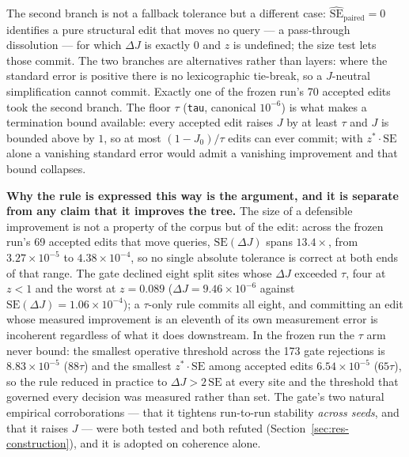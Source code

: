 The second branch is not a fallback tolerance but a different case:
$\widehat{\mathrm{SE}}_{\text{paired}} = 0$ identifies a pure structural edit that moves
no query --- a pass-through dissolution --- for which $\Delta J$ is exactly $0$ and $z$
is undefined; the size test lets those commit. The two branches are alternatives rather
than layers: where the standard error is positive there is no lexicographic tie-break, so
a $J$-neutral simplification cannot commit. Exactly one of the frozen run's 70 accepted
edits took the second branch.
The floor $\tau$ (\texttt{tau}, canonical $10^{-6}$) is what makes a termination bound
available: every accepted edit raises $J$ by at least $\tau$ and $J$ is bounded above by
$1$, so at most $(1 - J_0)/\tau$ edits can ever commit; with $z^{*}\cdot\mathrm{SE}$
alone a vanishing standard error would admit a vanishing improvement and that bound
collapses.

\textbf{Why the rule is expressed this way is the argument, and it is separate from any
claim that it improves the tree.}
The size of a defensible improvement is not a property of the corpus but of the edit:
across the frozen run's 69 accepted edits that move queries, $\mathrm{SE}(\Delta J)$
spans $13.4\times$, from $3.27\times10^{-5}$ to $4.38\times10^{-4}$, so no single
absolute tolerance is correct at both ends of that range.
The gate declined eight split sites whose $\Delta J$ exceeded $\tau$, four at $z < 1$
and the worst at $z = 0.089$ ($\Delta J = 9.46\times10^{-6}$ against
$\mathrm{SE}(\Delta J) = 1.06\times10^{-4}$); a $\tau$-only rule commits all eight, and
committing an edit whose measured improvement is an eleventh of its own measurement error
is incoherent regardless of what it does downstream.
In the frozen run the $\tau$ arm never bound: the smallest operative threshold across
the 173 gate rejections is $8.83\times10^{-5}$ ($88\tau$) and the smallest
$z^{*}\cdot\mathrm{SE}$ among accepted edits $6.54\times10^{-5}$ ($65\tau$), so the rule
reduced in practice to $\Delta J > 2\,\mathrm{SE}$ at every site and the threshold that
governed every decision was measured rather than set.
The gate's two natural empirical corroborations --- that it tightens run-to-run
stability \emph{across seeds}, and that it raises $J$ --- were both tested and both
refuted (Section~\ref{sec:res-construction}), and it is adopted on coherence alone.

